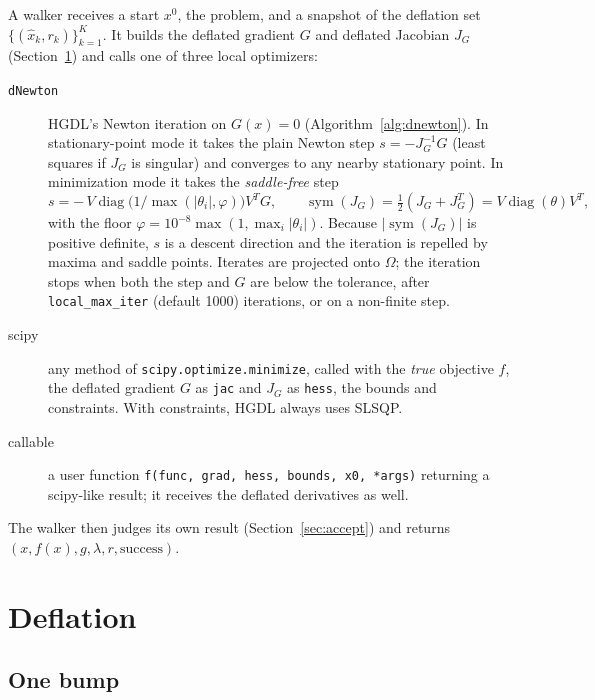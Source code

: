 \documentclass[11pt]{article}
\newcommand{\code}[1]{\texttt{#1}}
\newcommand{\xh}{\hat{x}}
\DeclareMathOperator{\sym}{sym}
\DeclareMathOperator{\diag}{diag}
\begin{document}
A walker receives a start $x^0$, the problem, and a snapshot of the deflation set
$\{(\xh_k, r_k)\}_{k=1}^K$. It builds the deflated gradient $G$ and deflated Jacobian $J_G$
(Section~\ref{sec:deflation}) and calls one of three local optimizers:

\begin{description}
  \item[\code{dNewton}] HGDL's Newton iteration on $G(x) = 0$ (Algorithm~\ref{alg:dnewton}).
  In stationary-point mode it takes the plain Newton step $s = -J_G^{-1} G$ (least squares if
  $J_G$ is singular) and converges to any nearby stationary point. In minimization mode it takes
  the \emph{saddle-free} step~\cite{dauphin2014}
  \begin{equation}\label{eq:saddlefree}
    s = -\,V \diag\!\big(1/\max(|\theta_i|, \varphi)\big) V^T G,
    \qquad \sym(J_G) = \tfrac12 (J_G + J_G^T) = V \diag(\theta) V^T,
  \end{equation}
  with the floor $\varphi = 10^{-8}\max(1, \max_i|\theta_i|)$. Because $|\sym(J_G)|$ is positive
  definite, $s$ is a descent direction and the iteration is repelled by maxima and saddle points.
  Iterates are projected onto $\Omega$; the iteration stops when both the step and $G$ are
  below the tolerance, after \code{local\_max\_iter} (default 1000) iterations, or on a
  non-finite step.
  \item[scipy] any method of \code{scipy.optimize.minimize}, called with the \emph{true}
  objective $f$, the deflated gradient $G$ as \code{jac} and $J_G$ as \code{hess}, the bounds
  and constraints. With constraints, HGDL always uses SLSQP.
  \item[callable] a user function \code{f(func, grad, hess, bounds, x0, *args)} returning a
  scipy-like result; it receives the deflated derivatives as well.
\end{description}

The walker then judges its own result (Section~\ref{sec:accept}) and returns
$(x, f(x), g, \lambda, r, \text{success})$.

\section{Deflation}\label{sec:deflation}

\subsection{One bump}
\end{document}
